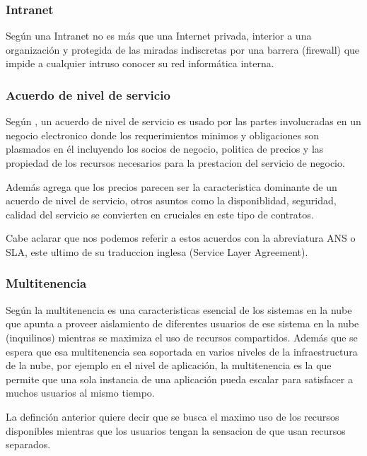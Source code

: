 \subsubsection{Intranet}
Seg\'un \cite{lafrance} una Intranet no es m\'as que una Internet privada, interior a una
organizaci\'on y protegida de las miradas indiscretas por una barrera (firewall) que
impide a cualquier intruso conocer su red inform\'atica interna.
\subsubsection{Acuerdo de nivel de servicio}
Seg\'un \cite{qianq}, un acuerdo de nivel de servicio es usado por las partes
involucradas en un negocio electronico donde los requerimientos minimos y obligaciones son
plasmados en \'el incluyendo los socios de negocio, politica de precios y las propiedad
de los recursos necesarios para la prestacion del servicio de negocio.

Adem\'as \cite{qianq} agrega que los precios parecen ser la caracteristica dominante
de un acuerdo de nivel de servicio, otros asuntos como la disponiblidad, seguridad,
calidad del servicio se convierten en cruciales en este tipo de contratos.

Cabe aclarar que nos podemos referir a estos acuerdos con la abreviatura ANS o SLA,
este ultimo de su traduccion inglesa (Service Layer Agreement).
\subsubsection{Multitenencia}

Seg\'un \cite{chandra} la multitenencia es una caracteristicas esencial de los
sistemas en la nube que apunta a proveer aislamiento de diferentes usuarios de
ese sistema en la nube (inquilinos) mientras se maximiza el uso de recursos compartidos.
Adem\'as \citep{chandra} que se espera que esa multitenencia sea soportada en varios niveles de la infraestructura
de la nube, por ejemplo en el nivel de aplicaci\'on, la multitenencia es la que permite
que una sola instancia de una aplicaci\'on pueda escalar para satisfacer a muchos
usuarios al mismo tiempo.

La definci\'on anterior quiere decir que se busca el maximo uso de los recursos
disponibles mientras que los usuarios tengan la sensacion de que usan recursos
separados.
